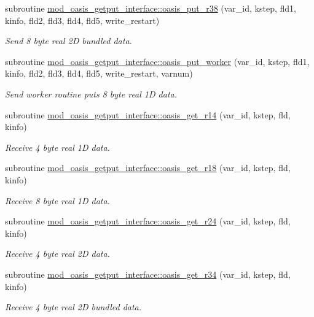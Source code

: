 \begin{DoxyCompactItemize}
subroutine \hyperlink{namespacemod__oasis__getput__interface_a6e458b3434ebc22a8c0a6de7d2b6328f}{mod\+\_\+oasis\+\_\+getput\+\_\+interface\+::oasis\+\_\+put\+\_\+r38} (var\+\_\+id, kstep, fld1, kinfo, fld2, fld3, fld4, fld5, write\+\_\+restart)
\begin{DoxyCompactList}\small\item\em Send 8 byte real 2D bundled data. \end{DoxyCompactList}\item 
subroutine \hyperlink{namespacemod__oasis__getput__interface_a13fcf0d2a7c31cfbbb24087d24c4f851}{mod\+\_\+oasis\+\_\+getput\+\_\+interface\+::oasis\+\_\+put\+\_\+worker} (var\+\_\+id, kstep, fld1, kinfo, fld2, fld3, fld4, fld5, write\+\_\+restart, varnum)
\begin{DoxyCompactList}\small\item\em Send worker routine puts 8 byte real 1D data. \end{DoxyCompactList}\item 
subroutine \hyperlink{namespacemod__oasis__getput__interface_a49f5cde883b1f5210e58c709e944df7c}{mod\+\_\+oasis\+\_\+getput\+\_\+interface\+::oasis\+\_\+get\+\_\+r14} (var\+\_\+id, kstep, fld, kinfo)
\begin{DoxyCompactList}\small\item\em Receive 4 byte real 1D data. \end{DoxyCompactList}\item 
subroutine \hyperlink{namespacemod__oasis__getput__interface_a10fac7c611232bd788e32c0487ee5625}{mod\+\_\+oasis\+\_\+getput\+\_\+interface\+::oasis\+\_\+get\+\_\+r18} (var\+\_\+id, kstep, fld, kinfo)
\begin{DoxyCompactList}\small\item\em Receive 8 byte real 1D data. \end{DoxyCompactList}\item 
subroutine \hyperlink{namespacemod__oasis__getput__interface_ac28a61cf8ca51e358897bfffb43003b8}{mod\+\_\+oasis\+\_\+getput\+\_\+interface\+::oasis\+\_\+get\+\_\+r24} (var\+\_\+id, kstep, fld, kinfo)
\begin{DoxyCompactList}\small\item\em Receive 4 byte real 2D data. \end{DoxyCompactList}\item 
subroutine \hyperlink{namespacemod__oasis__getput__interface_a34b0221d424ce7f1597548f91407033f}{mod\+\_\+oasis\+\_\+getput\+\_\+interface\+::oasis\+\_\+get\+\_\+r34} (var\+\_\+id, kstep, fld, kinfo)
\begin{DoxyCompactList}\small\item\em Receive 4 byte real 2D bundled data. \end{DoxyCompactList}\item 

\end{DoxyCompactItemize}
